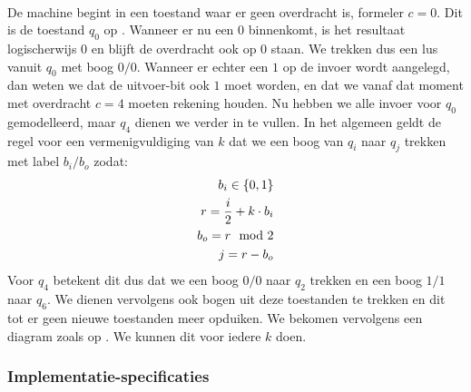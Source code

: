 \paragraph{}
De machine begint in een toestand waar er geen overdracht is, formeler $c=0$. Dit is de toestand $q_0$ op . Wanneer er nu een $0$ binnenkomt, is het resultaat logischerwijs $0$ en blijft de overdracht ook op $0$ staan. We trekken dus een lus vanuit $q_0$ met boog $0/0$. Wanneer er echter een $1$ op de invoer wordt aangelegd, dan weten we dat de uitvoer-bit ook $1$ moet worden, en dat we vanaf dat moment met overdracht $c=4$ moeten rekening houden. Nu hebben we alle invoer voor $q_0$ gemodelleerd, maar $q_4$ dienen we verder in te vullen. In het algemeen geldt de regel voor een vermenigvuldiging van $k$ dat we een boog van $q_i$ naar $q_j$ trekken met label $b_i/b_o$ zodat:
\begin{eqnarray}
b_i\in\left\{ 0,1 \right\}\\
r=\displaystyle\frac{i}{2}+k\cdot b_i\\
b_o=r\mod 2\\
j=r-b_o
\end{eqnarray}
Voor $q_4$ betekent dit dus dat we een boog $0/0$ naar $q_2$ trekken en een boog $1/1$ naar $q_6$. We dienen vervolgens ook bogen uit deze toestanden te trekken en dit tot er geen nieuwe toestanden meer opduiken. We bekomen vervolgens een diagram zoals op . We kunnen dit voor iedere $k$ doen.
\subsubsection{Implementatie-specificaties}
